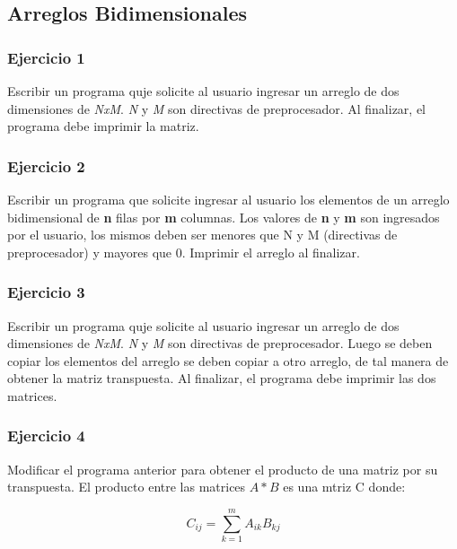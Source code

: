 \subsection*{Arreglos Bidimensionales} 

\subsubsection{Ejercicio 1} 
Escribir un programa quje solicite al usuario ingresar un arreglo de dos dimensiones de \textit{NxM}. \textit{N} y \textit{M} son directivas de preprocesador. Al finalizar, el programa debe imprimir la matriz.

\subsubsection{Ejercicio 2} 
Escribir un programa que solicite ingresar al usuario los elementos de un arreglo bidimensional de \textbf{n} filas por  \textbf{m} columnas. Los valores de \textbf{n} y \textbf{m} son ingresados por el usuario, los mismos deben ser menores que N y M (directivas de preprocesador) y mayores que 0. Imprimir el arreglo al finalizar.

\subsubsection{Ejercicio 3} 
Escribir un programa quje solicite al usuario ingresar un arreglo de dos dimensiones de \textit{NxM}. \textit{N} y \textit{M} son directivas de preprocesador. Luego se deben copiar los elementos del arreglo se deben copiar a otro arreglo, de tal manera de obtener la matriz transpuesta.
Al finalizar, el programa debe imprimir las dos matrices.

\subsubsection{Ejercicio 4} 
Modificar el programa anterior para obtener el producto de una matriz por su transpuesta. El producto entre las matrices $A*B$ es una mtriz C donde:

$$C_{ij}=\sum_{k=1}^{m}{A_{ik}B_{kj}} $$

